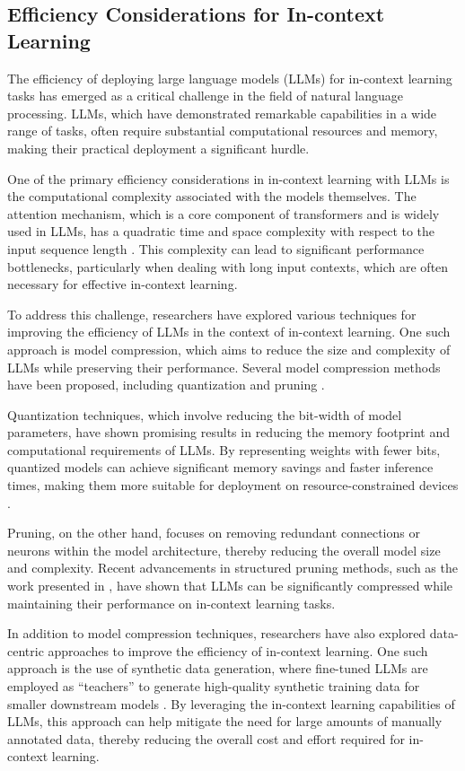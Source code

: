 \documentclass[11pt]{article}
\begin{document}
\subsection{Efficiency Considerations for In-context Learning}

The efficiency of deploying large language models (LLMs) for in-context learning tasks has emerged as a critical challenge in the field of natural language processing. LLMs, which have demonstrated remarkable capabilities in a wide range of tasks, often require substantial computational resources and memory, making their practical deployment a significant hurdle.

One of the primary efficiency considerations in in-context learning with LLMs is the computational complexity associated with the models themselves. The attention mechanism, which is a core component of transformers and is widely used in LLMs, has a quadratic time and space complexity with respect to the input sequence length \cite{ref213}. This complexity can lead to significant performance bottlenecks, particularly when dealing with long input contexts, which are often necessary for effective in-context learning.

To address this challenge, researchers have explored various techniques for improving the efficiency of LLMs in the context of in-context learning. One such approach is model compression, which aims to reduce the size and complexity of LLMs while preserving their performance. Several model compression methods have been proposed, including quantization \cite{ref214} and pruning \cite{ref215}.

Quantization techniques, which involve reducing the bit-width of model parameters, have shown promising results in reducing the memory footprint and computational requirements of LLMs. By representing weights with fewer bits, quantized models can achieve significant memory savings and faster inference times, making them more suitable for deployment on resource-constrained devices \cite{ref214}.

Pruning, on the other hand, focuses on removing redundant connections or neurons within the model architecture, thereby reducing the overall model size and complexity. Recent advancements in structured pruning methods, such as the work presented in \cite{ref215}, have shown that LLMs can be significantly compressed while maintaining their performance on in-context learning tasks.

In addition to model compression techniques, researchers have also explored data-centric approaches to improve the efficiency of in-context learning. One such approach is the use of synthetic data generation, where fine-tuned LLMs are employed as ``teachers'' to generate high-quality synthetic training data for smaller downstream models \cite{ref216}. By leveraging the in-context learning capabilities of LLMs, this approach can help mitigate the need for large amounts of manually annotated data, thereby reducing the overall cost and effort required for in-context learning.
\end{document}
